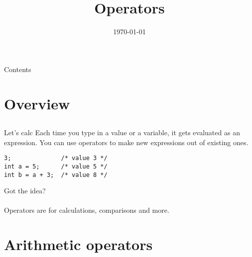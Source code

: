 
\newcommand{\topic}{
	Operators
}

\title{\topic}
\supertitle{\course}
\date{\today}



\maketitle

\begin{frame}{Contents}
	\tableofcontents
\end{frame}

\section{Overview}
\subsection{}
\begin{frame}[fragile]{Let's calc}
	Each time you type in a value or a variable, it gets evaluated as an expression. You can use operators to make new expressions out of existing ones.
	\begin{lstlisting}[numbers=none]
3;				/* value 3 */
int a = 5; 		/* value 5 */
int b = a + 3;	/* value 8 */
\end{lstlisting}
Got the idea?\\
\ \\Operators are for calculations, comparisons and more.
\end{frame}
\section{Arithmetic operators}
